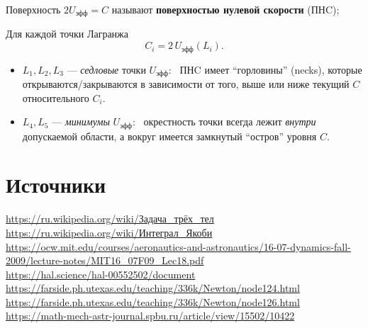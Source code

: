 \documentclass[12pt]{article}
\begin{document}
Поверхность $2U_{\mathrm{эфф}}=C$ называют \textbf{поверхностью нулевой скорости} (ПНC);

Для каждой точки Лагранжа
\[
C_i = 2\,U_{\mathrm{эфф}}(L_i).
\]

\begin{itemize}
  \item $L_1,L_2,L_3$ --- \emph{седловые} точки $U_{\mathrm{эфф}}$: \
        ПНC имеет ``горловины'' (necks), которые открываются/закрываются
        в зависимости от того, выше или ниже текущий $C$ относительного $C_i$.
  \item $L_4,L_5$ --- \emph{минимумы} $U_{\mathrm{эфф}}$: \
        окрестность точки всегда лежит {\it внутри} допускаемой области,
        а вокруг имеется замкнутый ``остров'' уровня $C$.
\end{itemize}

\section{Источники}

\url{https://ru.wikipedia.org/wiki/Задача_трёх_тел}\\
\url{https://ru.wikipedia.org/wiki/Интеграл_Якоби}\\
\url{https://ocw.mit.edu/courses/aeronautics-and-astronautics/16-07-dynamics-fall-2009/lecture-notes/MIT16_07F09_Lec18.pdf}\\
\url{https://hal.science/hal-00552502/document}\\
\url{https://farside.ph.utexas.edu/teaching/336k/Newton/node124.html}\\
\url{https://farside.ph.utexas.edu/teaching/336k/Newton/node126.html}\\
\url{https://math-mech-astr-journal.spbu.ru/article/view/15502/10422}\\
\end{document}
